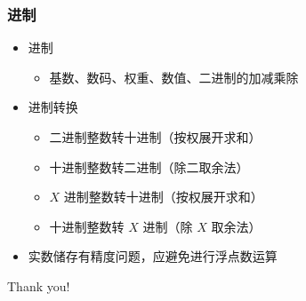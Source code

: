 \begin{frame}[fragile]
    \frametitle{进制}

    \begin{itemize}
        \item<1-> 进制
        
            \begin{itemize}
                \item 基数、数码、权重、数值、二进制的加减乘除
            \end{itemize}

        \item<2-> 进制转换
        
            \begin{itemize}
                \item 二进制整数转十进制（按权展开求和）
                \item 十进制整数转二进制（除二取余法）
                \item $X$ 进制整数转十进制（按权展开求和）
                \item 十进制整数转 $X$ 进制（除 $X$ 取余法）
            \end{itemize}
       
        \item<3-> 实数储存有精度问题，应避免进行浮点数运算
    \end{itemize}
\end{frame}

\begin{frame}
    \begin{center}
        {\Huge Thank you!}
    \end{center}
\end{frame}


